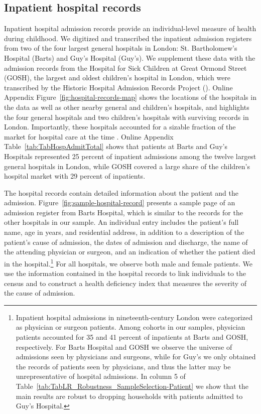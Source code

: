 \documentclass[12pt,english]{article}
\begin{document}
\subsection{Inpatient hospital records\label{sec:hospitaldata}}

Inpatient hospital admission records provide an individual-level measure of health during childhood. We digitized and transcribed the inpatient admission registers from two of the four largest general hospitals in London: St. Bartholomew's Hospital (Barts) and Guy's Hospital (Guy's). We supplement these data with the admission records from the Hospital for Sick Children at Great Ormond Street (GOSH), the largest and oldest children's hospital in London, which were transcribed by the Historic Hospital Admission Records Project (\citealt{Hawkins2010}). Online Appendix Figure~\ref{fig:hospital-records-map} shows the locations of the hospitals in the data as well as other nearby general and children's hospitals, and highlights the four general hospitals and two children's hospitals with surviving records in London. Importantly, these hospitals accounted for a sizable fraction of the market for hospital care at the time \citep{Belgravia1897}. Online Appendix Table~\ref{tab:TabHospAdmitTotal} shows that patients at Barts and Guy's Hospitals represented 25 percent of inpatient admissions among the twelve largest general hospitals in London, while GOSH covered a large share of the children's hospital market with 29 percent of inpatients.

The hospital records contain detailed information about the patient and the admission. Figure~\ref{fig:sample-hospital-record} presents a sample page of an admission register from Barts Hospital, which is similar to the records for the other hospitals in our sample. An individual entry includes the patient's full name, age in years, and residential address, in addition to a description of the patient's cause of admission, the dates of admission and discharge, the name of the attending physician or surgeon, and an indication of whether the patient died in the hospital.\footnote{Inpatient hospital admissions in nineteenth-century London were categorized as physician or surgeon patients. Among cohorts in our samples, physician patients accounted for 35 and 41 percent of inpatients at Barts and GOSH, respectively. For Barts Hospital and GOSH we observe the universe of admissions seen by physicians and surgeons, while for Guy's we only obtained the records of patients seen by physicians, and thus the latter may be unrepresentative of hospital admissions. In column 5 of Table~\ref{tab:TabLR_Robustness_SampleSelection-Patient} we show that the main results are robust to dropping households with patients admitted to Guy's Hospital.} For all hospitals, we observe both male and female patients. We use the information contained in the hospital records to link individuals to the census and to construct a health deficiency index that measures the severity of the cause of admission. 
\end{document}

